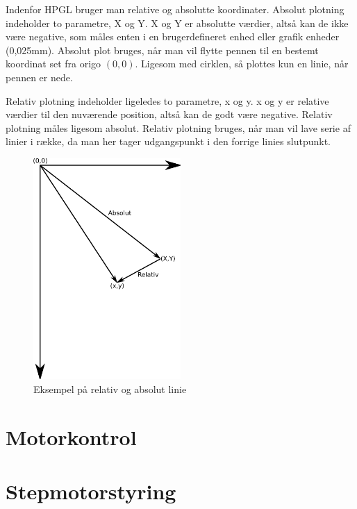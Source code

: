 Indenfor HPGL bruger man relative og absolutte koordinater. Absolut plotning indeholder to parametre, X og Y. X og Y er absolutte værdier, altså kan de ikke være negative, som måles enten i en brugerdefineret enhed eller grafik enheder (0,025mm). Absolut plot bruges, når man vil flytte pennen til en bestemt koordinat set fra origo $(0, 0)$. Ligesom med cirklen, så plottes kun en linie, når pennen er nede.


Relativ plotning indeholder ligeledes to parametre, x og y. x og y er relative værdier til den nuværende position, altså kan de godt være negative. Relativ plotning måles ligesom absolut. Relativ plotning bruges, når man vil lave serie af linier i række, da man her tager udgangspunkt i den forrige linies slutpunkt. 

\begin{figure}[htbp]
  \centering
  \includegraphics[width=0.5\textwidth]{./img/relativ-absolut}
  \caption{Eksempel på relativ og absolut linie}
  \label{fig:relativ-absolut}
\end{figure}

\section[Motorkontrol (med buffer)]{Motorkontrol}



\section{Stepmotorstyring}

